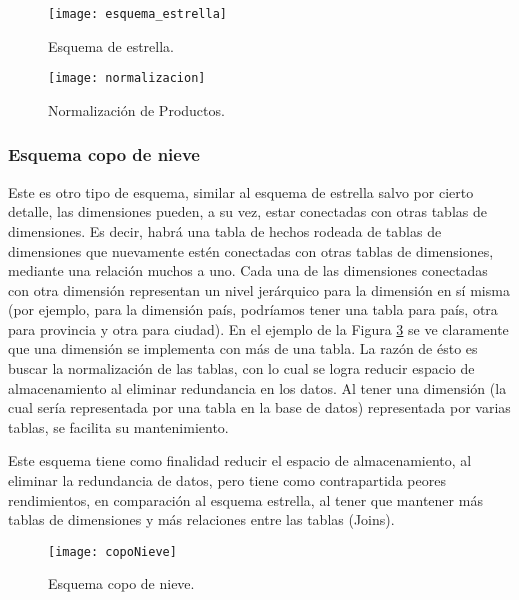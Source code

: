 \documentclass[a4paper,11pt]{article}
\begin{document}
    \begin{figure}
      \begin{center}
        \texttt{[image: esquema\_estrella]}
        \caption{Esquema de estrella. \cite{dim_models}}
        \label{star_sch}
      \end{center}
    \end{figure}
    
    \begin{figure}
      \begin{center}
        \texttt{[image: normalizacion]}
        \caption{Normalización de Productos. \cite{dim_models}}
        \label{normalizado}
      \end{center}
    \end{figure}
    
    
    \subsubsection{Esquema copo de nieve}
    
    Este es otro tipo de esquema, similar al esquema de estrella salvo por cierto detalle, las dimensiones pueden, a su vez, estar conectadas con otras 
    tablas de dimensiones. Es decir, habrá una tabla de hechos rodeada de tablas de dimensiones que nuevamente estén conectadas con otras tablas de 
    dimensiones, mediante una relación muchos a uno. Cada una de las dimensiones conectadas con otra dimensión representan un nivel jerárquico para la dimensión en 
    sí misma (por ejemplo, para la dimensión país, podríamos tener una tabla para país, otra para provincia y otra para ciudad). En el ejemplo de la Figura 
    \ref{snow_flk_sch} se ve claramente que una dimensión se implementa con más de una tabla. La razón de ésto es buscar la normalización de las tablas, con 
    lo cual se logra reducir espacio de almacenamiento al eliminar redundancia en los datos. Al tener una dimensión (la cual sería representada por una tabla 
    en la base de datos) representada por varias tablas, se facilita su mantenimiento.
    
    Este esquema tiene como finalidad reducir el espacio de almacenamiento, al eliminar la redundancia de datos, pero tiene como contrapartida
    peores rendimientos, en comparación al esquema estrella, al tener que mantener más tablas de dimensiones y más relaciones entre las tablas (Joins).
    
    \begin{figure}
      \begin{center}
        \texttt{[image: copoNieve]}
        \caption{Esquema copo de nieve. \cite{dim_models}}
        \label{snow_flk_sch}
      \end{center}
    \end{figure}
    
\end{document}
